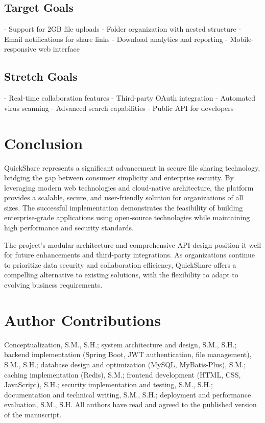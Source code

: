 \documentclass[final]{cvpr}
\begin{document}
\subsection{Target Goals}
- Support for 2GB file uploads
- Folder organization with nested structure
- Email notifications for share links
- Download analytics and reporting
- Mobile-responsive web interface

\subsection{Stretch Goals}
- Real-time collaboration features
- Third-party OAuth integration
- Automated virus scanning
- Advanced search capabilities
- Public API for developers

\section{Conclusion}

QuickShare represents a significant advancement in secure file sharing technology, bridging the gap between consumer simplicity and enterprise security. By leveraging modern web technologies and cloud-native architecture, the platform provides a scalable, secure, and user-friendly solution for organizations of all sizes. The successful implementation demonstrates the feasibility of building enterprise-grade applications using open-source technologies while maintaining high performance and security standards.

The project's modular architecture and comprehensive API design position it well for future enhancements and third-party integrations. As organizations continue to prioritize data security and collaboration efficiency, QuickShare offers a compelling alternative to existing solutions, with the flexibility to adapt to evolving business requirements.

\section{Author Contributions}

Conceptualization, S.M., S.H.; system architecture and design, S.M., S.H.; backend implementation (Spring Boot, JWT authentication, file management), S.M., S.H.; database design and optimization (MySQL, MyBatis-Plus), S.M.; caching implementation (Redis), S.M.; frontend development (HTML, CSS, JavaScript), S.H.; security implementation and testing, S.M., S.H.; documentation and technical writing, S.M., S.H.; deployment and performance evaluation, S.M., S.H. All authors have read and agreed to the published version of the manuscript.


{\small


}
\end{document}
